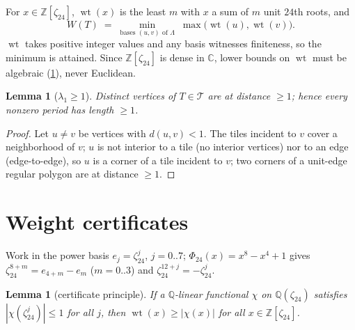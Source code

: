 \documentclass[11pt,a4paper,oneside]{article}
\theoremstyle{plain}
\newtheorem{lemma}[theorem]{Lemma}
\theoremstyle{definition}
\theoremstyle{remark}
\DeclareMathOperator{\wt}{wt}
\newcommand{\ZZ}{\mathbb{Z}}
\newcommand{\QQ}{\mathbb{Q}}
\newcommand{\CC}{\mathbb{C}}
\newcommand{\Tcl}{\mathcal{T}}
\newcommand{\zt}[1]{\zeta_{#1}}
\begin{document}
For $x \in \ZZ[\zt{24}]$, $\wt(x)$ is the least $m$ with $x$ a sum of $m$ unit
$24$th roots, and
\[
W(T) \;=\; \min_{\text{bases } (u,v) \text{ of } \Lambda} \; \max\bigl(\wt(u), \wt(v)\bigr).
\]
$\wt$ takes positive integer values and any basis witnesses finiteness, so the minimum is
attained. Since $\ZZ[\zt{24}]$ is dense in $\CC$, lower bounds on $\wt$ must be algebraic
(\cref{sec:certificates}), never Euclidean.

\begin{lemma}[$\lambda_1 \ge 1$]\label{lem:lambda1}
Distinct vertices of $T \in \Tcl$ are at distance $\ge 1$; hence every nonzero period has
length $\ge 1$.
\end{lemma}
\begin{proof}
Let $u \ne v$ be vertices with $d(u,v) < 1$. The tiles incident to $v$ cover a neighborhood
of $v$; $u$ is not interior to a tile (no interior vertices) nor to an edge (edge-to-edge),
so $u$ is a corner of a tile incident to $v$; two corners of a unit-edge regular polygon are
at distance $\ge 1$.
\end{proof}

\section{Weight certificates}\label{sec:certificates}

Work in the power basis $e_j = \zt{24}^j$, $j = 0..7$; $\Phi_{24}(x) = x^8 - x^4 + 1$ gives
$\zt{24}^{8+m} = e_{4+m} - e_m$ ($m = 0..3$) and $\zt{24}^{12+j} = -\zt{24}^j$.

\begin{lemma}[certificate principle]\label{lem:certprinciple}
If a $\QQ$-linear functional $\chi$ on $\QQ(\zt{24})$ satisfies $|\chi(\zt{24}^j)| \le 1$
for all $j$, then $\wt(x) \ge |\chi(x)|$ for all $x \in \ZZ[\zt{24}]$.
\end{lemma}
\end{document}
